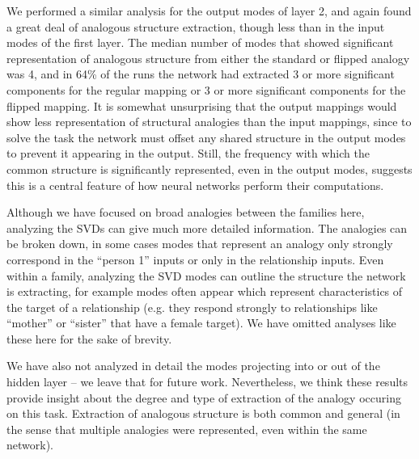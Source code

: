 \documentclass[10pt,letterpaper]{article}
\begin{document}
We performed a similar analysis for the output modes of layer 2, and again found a great deal of analogous structure extraction, though less than in the input modes of the first layer. The median number of modes that showed significant representation of analogous structure from either the standard or flipped analogy was 4, and in 64\% of the runs the network had extracted 3 or more significant components for the regular mapping or 3 or more significant components for the flipped mapping. It is somewhat unsurprising that the output mappings would show less representation of structural analogies than the input mappings, since to solve the task the network must offset any shared structure in the output modes to prevent it appearing in the output. Still, the frequency with which the common structure is significantly represented, even in the output modes, suggests this is a central feature of how neural networks perform their computations.  \par  
Although we have focused on broad analogies between the families here, analyzing the SVDs can give much more detailed information. The analogies can be broken down, in some cases modes that represent an analogy only strongly correspond in the ``person 1'' inputs or only in the relationship inputs. Even within a family, analyzing the SVD modes can outline the structure the network is extracting, for example modes often appear which represent characteristics of the target of a relationship (e.g. they respond strongly to relationships like ``mother'' or ``sister'' that have a female target). We have omitted analyses like these here for the sake of brevity. \par 
We have also not analyzed in detail the modes projecting into or out of the hidden layer -- we leave that for future work. Nevertheless, we think these results provide insight about the degree and type of extraction of the analogy occuring on this task. Extraction of analogous structure is both common and general (in the sense that multiple analogies were represented, even within the same network).
\end{document}
